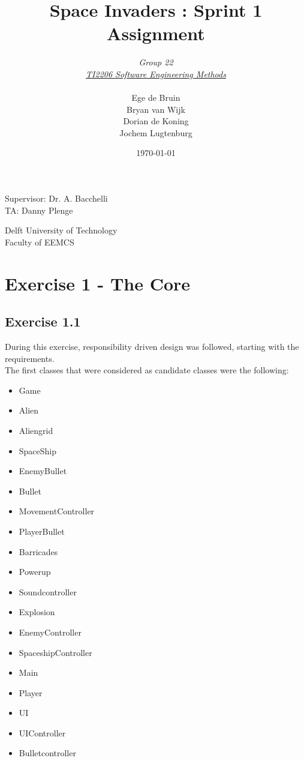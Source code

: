 \documentclass[10pt]{article}
\begin{document}
\title{Space Invaders : Sprint 1 Assignment}
\date{\today}
\author{\textit{Group 22}\\ \textit{\underline{TI2206 Software Engineering Methods}} \\
 \\Ege de Bruin \\ Bryan van Wijk \\ Dorian de Koning \\ Jochem Lugtenburg }
 \maketitle  
 \begin{center}
Supervisor: Dr. A. Bacchelli\\
TA: Danny Plenge\\
 \end{center}     
 \begin{center}
 Delft University of Technology\\
 Faculty of EEMCS\\
 \end{center}
 \thispagestyle{empty}
 \pagebreak
 
\section{Exercise 1 - The Core}

 \subsection*{Exercise 1.1}

During this exercise, responsibility driven design was followed, starting with the requirements.\\
The first classes that were considered as candidate classes were the following:
\begin{itemize}
  \item Game
  \item Alien
  \item Aliengrid
  \item SpaceShip
  \item EnemyBullet
\item Bullet
\item MovementController
\item PlayerBullet
\item Barricades
\item Powerup
\item Soundcontroller
\item Explosion
\item EnemyController
\item SpaceshipController
\item Main
\item Player
\item UI
\item UIController
\item Bulletcontroller

\end{itemize}
\end{document}
